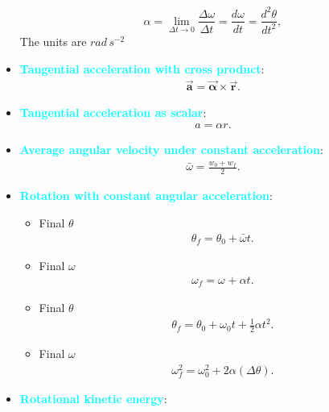 \documentclass{report}
\begin{document}
\begin{itemize}
            \[
                \alpha = \lim_{\Delta t \to 0} \frac{\Delta \omega}{\Delta t} = \frac{d\omega}{dt} = \frac{d^2\theta}{dt^2},
            \]
            The units are $rad\, s^{-2} $
        \item \textbf{\textcolor{cyan}{Tangential acceleration with cross product}}:
            \begin{align*}
                \vec{\mathbf{a}} = \vec{\mathbf{\alpha}} \times \vec{\mathbf{r}}
            .\end{align*}
        \item \textbf{\textcolor{cyan}{Tangential acceleration as scalar}}:
            \begin{align*}
                a = \alpha r
            .\end{align*}
        \item \textbf{\textcolor{cyan}{Average angular velocity under constant acceleration}}:
            \begin{align*}
                \bar{\omega} = \frac{w_{0} + w_{f}}{2}
            .\end{align*}
        \item \textbf{\textcolor{cyan}{Rotation with constant angular acceleration}}:
            \begin{itemize}
                \item Final $\theta$
                    \begin{align*}
                        \theta_{f} = \theta_{0} + \bar{\omega}t
                    .\end{align*}
                \item Final $\omega$
                    \begin{align*}
                        \omega_{f} = \omega_{} + \alpha t
                    .\end{align*}
                \item Final $\theta$
                    \begin{align*}
                        \theta_{f} = \theta_{0} + \omega_{0}t + \frac{1}{2}\alpha t^{2}
                    .\end{align*}
                \item Final $\omega$
                    \begin{align*}
                        \omega_{f}^{2} = \omega_{0}^{2} + 2\alpha(\Delta \theta )
                    .\end{align*}
            \end{itemize}
        \item \textbf{\textcolor{cyan}{Rotational kinetic energy}}:

\end{itemize}
\end{document}
